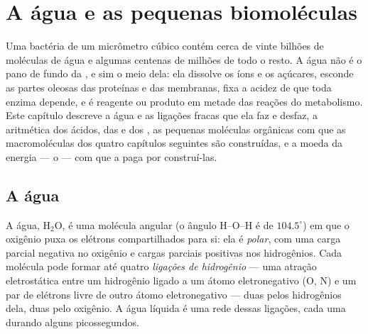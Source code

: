 \chapter{A água e as pequenas biomoléculas}\label{ch:b1:water-small-molecules}

Uma bactéria de um micrômetro cúbico contém cerca de vinte bilhões de
moléculas de água e algumas centenas de milhões de todo o resto. A água
não é o pano de fundo da , e sim o meio dela: ela dissolve os íons
e os açúcares, esconde as partes oleosas das proteínas e das membranas,
fixa a acidez de que toda enzima depende, e é reagente ou produto em
metade das reações do metabolismo. Este capítulo descreve a água e as
ligações fracas que ela faz e desfaz, a aritmética dos ácidos, das 
e dos , as pequenas moléculas orgânicas com que as
macromoléculas dos quatro capítulos seguintes são construídas, e a moeda
da energia --- o  --- com que a  paga por construí-las.

\section{A água}

\begin{definition}\label{def:b1:water-small-molecules:water}
A água, $\mathrm{H_2O}$, é uma molécula angular (o ângulo H--O--H é de
$104.5^\circ$) em que o oxigênio puxa os elétrons compartilhados para
si: ela é \emph{polar}, com uma carga parcial
negativa no oxigênio e cargas parciais positivas nos hidrogênios. Cada
molécula pode formar até quatro
\emph{ligações de hidrogênio} --- uma
atração eletrostática entre um hidrogênio ligado a um átomo
eletronegativo (O, N) e um par de elétrons livre de outro átomo
eletronegativo --- duas pelos hidrogênios dela, duas pelo oxigênio. A
água líquida é uma rede dessas ligações, cada uma durando alguns
picossegundos.
\end{definition}

